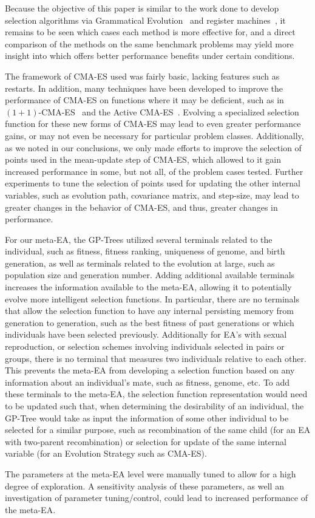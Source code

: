 \documentclass[sigconf]{acmart}
\begin{document}
Because the objective of this paper is similar to the work done to develop selection algorithms via Grammatical Evolution~\citep{lourencco2013selection} and register machines~\citep{woodward2011selection}, it remains to be seen which cases each method is more effective for, and a direct comparison of the methods on the same benchmark problems may yield more insight into which offers better performance benefits under certain conditions.

The framework of CMA-ES used was fairly basic, lacking features such as restarts. In addition, many techniques have been developed to improve the performance of CMA-ES on functions where it may be deficient, such as in $(1+1)$-CMA-ES~\citep{igel2006cmaes1plus1} and the Active CMA-ES~\citep{jastrebski2006activecmaes}. Evolving a specialized selection function for these new forms of CMA-ES may lead to even greater performance gains, or may not even be necessary for particular problem classes. Additionally, as we noted in our conclusions, we only made efforts to improve the selection of points used in the mean-update step of CMA-ES, which allowed to it gain increased performance in some, but not all, of the problem cases tested. Further experiments to tune the selection of points used for updating the other internal variables, such as evolution path, covariance matrix, and step-size, may lead to greater changes in the behavior of CMA-ES, and thus, greater changes in performance.

For our meta-EA, the GP-Trees utilized several terminals related to the individual, such as fitness, fitness ranking, uniqueness of genome, and birth generation, as well as terminals related to the evolution at large, such as population size and generation number. Adding additional available terminals increases the information available to the meta-EA, allowing it to potentially evolve more intelligent selection functions. In particular, there are no terminals that allow the selection function to have any internal persisting memory from generation to generation, such as the best fitness of past generations or which individuals have been selected previously. Additionally for EA's with sexual reproduction, or selection schemes involving individuals selected in pairs or groups, there is no terminal that measures two individuals relative to each other. This prevents the meta-EA from developing a selection function based on any information about an individual's mate, such as fitness, genome, etc. To add these terminals to the meta-EA, the selection function representation would need to be updated such that, when determining the desirability of an individual, the GP-Tree would take as input the information of some other individual to be selected for a similar purpose, such as recombination of the same child (for an EA with two-parent recombination) or selection for update of the same internal variable (for an Evolution Strategy such as CMA-ES).

The parameters at the meta-EA level were manually tuned to allow for a high degree of exploration. A sensitivity analysis of these parameters, as well an investigation of parameter tuning/control, could lead to increased performance of the meta-EA.


 
\end{document}
